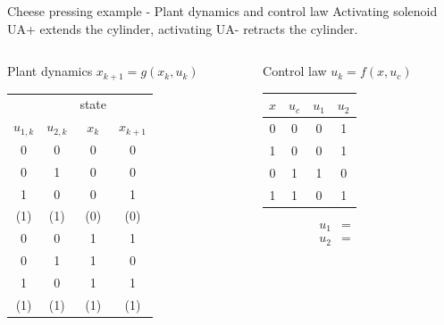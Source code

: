 \documentclass[presentation,aspectratio=1610]{beamer}
\begin{document}
\begin{frame}[label={sec:org3e108fb}]{Cheese pressing example - Plant dynamics and control law}
Activating solenoid UA+ extends the cylinder, activating  UA- retracts the cylinder.
\begin{columns}
\begin{column}{0.5\columnwidth}
\begin{block}{Plant dynamics \(x_{k+1} = g(x_k, u_k)\)}
\begin{center}
\begin{tabular}{|cc|cc|}
\hline
 &  & state & \\
\(u_{1,k}\) & \(u_{2,k}\) & \(x_k\) & \(x_{k+1}\)\\
\hline
0 & 0 & 0 & 0\\
0 & 1 & 0 & 0\\
1 & 0 & 0 & 1\\
(1) & (1) & (0) & (0)\\
0 & 0 & 1 & 1\\
0 & 1 & 1 & 0\\
1 & 0 & 1 & 1\\
(1) & (1) & (1) & (1)\\
\hline
\end{tabular}
\end{center}
\end{block}
\end{column}

\begin{column}{0.5\columnwidth}
\begin{block}{Control law \(u_k = f(x, u_c)\)}
\begin{center}
\begin{tabular}{|cc|cc|}
\hline
\(x\) & \(u_{c}\) & \(u_1\) & \(u_2\)\\
\hline
0 & 0 & 0 & 1\\
1 & 0 & 0 & 1\\
0 & 1 & 1 & 0\\
1 & 1 & 0 & 1\\
\hline
\end{tabular}
\end{center}

\begin{align*}
  u_1 &= \qquad\qquad\\
  u_2 &= 
\end{align*}
\end{block}
\end{column}
\end{columns}
\end{frame}
\end{document}
